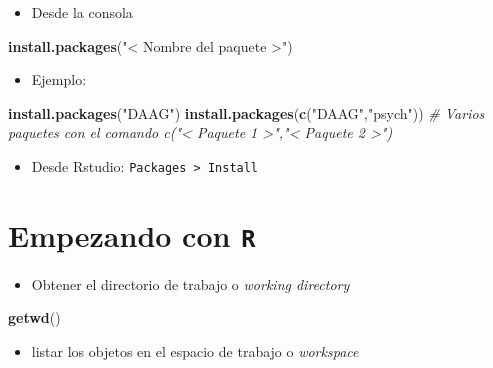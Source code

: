 \documentclass[]{book}
\newenvironment{Shaded}{\begin{snugshade}}{\end{snugshade}}
\newcommand{\KeywordTok}[1]{\textcolor[rgb]{0.13,0.29,0.53}{\textbf{#1}}}
\newcommand{\StringTok}[1]{\textcolor[rgb]{0.31,0.60,0.02}{#1}}
\newcommand{\CommentTok}[1]{\textcolor[rgb]{0.56,0.35,0.01}{\textit{#1}}}
\newcommand{\NormalTok}[1]{#1}
\providecommand{\tightlist}{%
  \setlength{\itemsep}{0pt}\setlength{\parskip}{0pt}}
\begin{document}
\begin{itemize}
\tightlist
\item
  Desde la consola
\end{itemize}

\begin{Shaded}
\begin{Highlighting}[]
\KeywordTok{install.packages}\NormalTok{(}\StringTok{"< Nombre del paquete >"}\NormalTok{)}
\end{Highlighting}
\end{Shaded}

\begin{itemize}
\tightlist
\item
  Ejemplo:
\end{itemize}

\begin{Shaded}
\begin{Highlighting}[]
\KeywordTok{install.packages}\NormalTok{(}\StringTok{"DAAG"}\NormalTok{)}
\KeywordTok{install.packages}\NormalTok{(}\KeywordTok{c}\NormalTok{(}\StringTok{"DAAG"}\NormalTok{,}\StringTok{"psych"}\NormalTok{)) }\CommentTok{# Varios paquetes con el comando c("< Paquete 1 >","< Paquete 2 >")}
\end{Highlighting}
\end{Shaded}

\begin{itemize}
\tightlist
\item
  Desde Rstudio: \texttt{Packages\ \textgreater{}\ Install}
\end{itemize}

\section{\texorpdfstring{Empezando con
\texttt{R}}{Empezando con R}}\label{empezando-con-r}

\begin{itemize}
\tightlist
\item
  Obtener el directorio de trabajo o \emph{working directory}
\end{itemize}

\begin{Shaded}
\begin{Highlighting}[]
\KeywordTok{getwd}\NormalTok{() }
\end{Highlighting}
\end{Shaded}

\begin{itemize}
\tightlist
\item
  listar los objetos en el espacio de trabajo o \emph{workspace}
\end{itemize}
\end{document}
